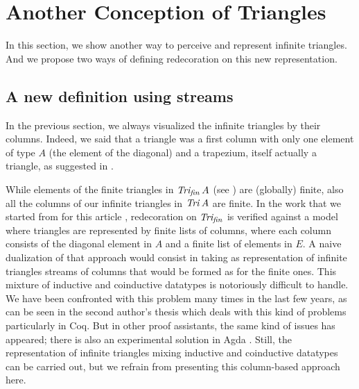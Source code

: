 \section{Another Conception of Triangles}\label{sect:streams}
In this section, we show another way to perceive and represent
infinite triangles. And we propose two ways of defining redecoration
on this new representation. 

\subsection{A new definition using streams}
In the previous section, we always visualized the infinite triangles
by their columns. Indeed, we said that a triangle was a first column
with only one element of type $A$ (the element of the diagonal) and a
trapezium, itself actually a triangle, as suggested in
. 

While elements of the finite triangles in $\mathit{Tri_{fin}}\,A$ (see
) are (globally) finite, also all the columns of our
infinite triangles in $\mathit{Tri}\,A$ are finite. In the work that we
started from for this article \cite{types07},
redecoration on $\mathit{Tri_{fin}}$ is verified against a model where triangles
are represented by finite lists of columns, where each column consists
of the diagonal element in $A$ and a finite list of elements in $E$. A
naive dualization of that approach would consist in taking as
representation of infinite triangles streams of columns that would be
formed as for the finite ones. This mixture of inductive and
coinductive datatypes is notoriously difficult to handle. We have been
confronted with this problem many times in the last few years, as can
be seen in the second author's thesis \cite{theseCP} which deals with this kind of problems
particularly in Coq. But in other proof assistants, the same kind of
issues has appeared; there is also an experimental solution in Agda \cite{dan, daal}.  Still, the representation of infinite
triangles mixing inductive and coinductive datatypes can be carried
out, but we refrain from presenting this column-based approach here.

